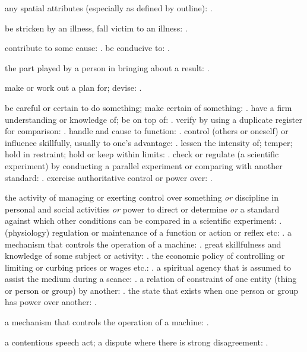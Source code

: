   any spatial attributes (especially as defined by outline): .

  be stricken by an illness, fall victim to an illness: .

  contribute to some cause: . be conducive to: .

  the part played by a person in bringing about a result: .

  make or work out a plan for; devise: .

  be careful or certain to do something; make certain of something: . have a firm understanding or knowledge of; be on top of: . verify by using a duplicate register for comparison: . handle and cause to function: . control (others or oneself) or influence skillfully, usually to one's advantage: . lessen the intensity of; temper; hold in restraint; hold or keep within limits: . check or regulate (a scientific experiment) by conducting a parallel experiment or comparing with another standard: . exercise authoritative control or power over: .

  the activity of managing or exerting control over something \textit{or} discipline in personal and social activities \textit{or} power to direct or determine \textit{or} a standard against which other conditions can be compared in a scientific experiment: . (physiology) regulation or maintenance of a function or action or reflex etc: . a mechanism that controls the operation of a machine: . great skillfulness and knowledge of some subject or activity: . the economic policy of controlling or limiting or curbing prices or wages etc.: . a spiritual agency that is assumed to assist the medium during a seance: . a relation of constraint of one entity (thing or person or group) by another: . the state that exists when one person or group has power over another: .

  a mechanism that controls the operation of a machine: .

  a contentious speech act; a dispute where there is strong disagreement: .


